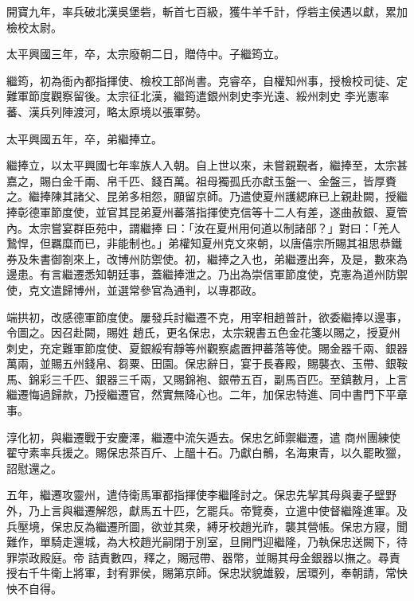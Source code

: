 \begin{pinyinscope}
 開寶九年，率兵破北漢吳堡砦，斬首七百級，獲牛羊千計，俘砦主侯遇以獻，累加檢校太尉。



 太平興國三年，卒，太宗廢朝二日，贈侍中。子繼筠立。



 繼筠，初為衙內都指揮使、檢校工部尚書。克睿卒，自權知州事，授檢校司徒、定難軍節度觀察留後。太宗征北漢，繼筠遣銀州刺史李光遠、綏州刺史
 李光憲率蕃、漢兵列陣渡河，略太原境以張軍勢。



 太平興國五年，卒，弟繼捧立。



 繼捧立，以太平興國七年率族人入朝。自上世以來，未嘗親覲者，繼捧至，太宗甚嘉之，賜白金千兩、帛千匹、錢百萬。祖母獨孤氏亦獻玉盤一、金盤三，皆厚賚之。繼捧陳其諸父、昆弟多相怨，願留京師。乃遣使夏州護緦麻已上親赴闕，授繼捧彰德軍節度使，並官其昆弟夏州蕃落指揮使克信等十二人有差，遂曲赦銀、夏管內。太宗嘗宴群臣苑中，謂繼捧
 曰：「汝在夏州用何道以制諸部？」對曰：「羌人鷙悍，但羈糜而已，非能制也。」弟權知夏州克文來朝，以唐僖宗所賜其祖思恭鐵券及朱書御劄來上，改博州防禦使。初，繼捧之入也，弟繼遷出奔，及是，數來為邊患。有言繼遷悉知朝廷事，蓋繼捧泄之。乃出為崇信軍節度使，克憲為道州防禦使，克文遣歸博州，並選常參官為通判，以專郡政。



 端拱初，改感德軍節度使。屢發兵討繼遷不克，用宰相趙普計，欲委繼捧以邊事，令圖之。因召赴闕，賜姓
 趙氏，更名保忠，太宗親書五色金花箋以賜之，授夏州刺史，充定難軍節度使、夏銀綏宥靜等州觀察處置押蕃落等使。賜金器千兩、銀器萬兩，並賜五州錢帛、芻粟、田園。保忠辭日，宴于長春殿，賜襲衣、玉帶、銀鞍馬、錦彩三千匹、銀器三千兩，又賜錦袍、銀帶五百，副馬百匹。至鎮數月，上言繼遷悔過歸款，乃授繼遷官，然實無降心也。二年，加保忠特進、同中書門下平章事。



 淳化初，與繼遷戰于安慶澤，繼遷中流矢遁去。保忠乞師禦繼遷，遣
 商州團練使翟守素率兵援之。賜保忠茶百斤、上醞十石。乃獻白鶻，名海東青，以久罷畋獵，詔慰還之。



 五年，繼遷攻靈州，遣侍衛馬軍都指揮使李繼隆討之。保忠先挈其母與妻子壁野外，乃上言與繼遷解怨，獻馬五十匹，乞罷兵。帝覽奏，立遣中使督繼隆進軍。及兵壓境，保忠反為繼遷所圖，欲並其衆，縛牙校趙光祚，襲其營帳。保忠方寢，聞難作，單騎走還城，為大校趙光嗣閉于別室，旦開門迎繼隆，乃執保忠送闕下，待罪崇政殿庭。帝
 詰責數四，釋之，賜冠帶、器幣，並賜其母金銀器以撫之。尋責授右千牛衛上將軍，封宥罪侯，賜第京師。保忠狀貌雄毅，居環列，奉朝請，常怏怏不自得。




\end{pinyinscope}
